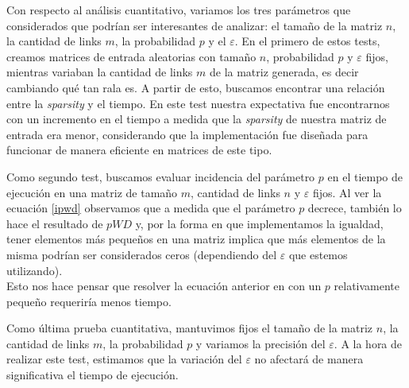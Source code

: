 \par 

Con respecto al an\'alisis cuantitativo, variamos los tres par\'ametros que considerados que podr\'ian ser interesantes de analizar:
el tama\~no de la matriz $n$, la cantidad de links $m$, la probabilidad $p$ y el $\varepsilon$.
\newline
En el primero de estos tests, creamos matrices de entrada aleatorias con tamaño $n$, probabilidad $p$ y $\varepsilon$ fijos, mientras variaban la cantidad de links $m$
de la matriz generada, es decir cambiando qu\'e tan rala es. A partir de esto, buscamos encontrar una relaci\'on entre la \textit{sparsity} y el tiempo.\newline
En este test nuestra expectativa fue encontrarnos con un incremento en el tiempo a medida 
que la \textit{sparsity} de nuestra matriz de entrada era menor, considerando que la
implementaci\'on fue diseñada para funcionar de manera eficiente en matrices de este tipo.

\par
Como segundo test, buscamos evaluar incidencia del par\'ametro $p$ en el tiempo de ejecuci\'on en una matriz de tamaño $m$, cantidad de links $n$ 
y $\varepsilon$ fijos.\newline
Al ver la ecuaci\'on \ref{ipwd} observamos que a medida que el par\'ametro $p$ decrece, tambi\'en lo hace el resultado de $pWD$ y, 
por la forma en que implementamos la igualdad, tener elementos m\'as pequeños en una matriz implica que m\'as elementos de la misma podr\'ian 
ser considerados ceros (dependiendo del $\varepsilon$ que estemos utilizando).\\
Esto nos hace pensar que resolver la ecuaci\'on anterior en con un $p$ relativamente pequeño  requerir\'ia menos tiempo.

\par
Como \'ultima prueba cuantitativa, mantuvimos fijos el tama\~no de la matriz $n$, la cantidad de links $m$, la probabilidad $p$ y variamos la precisi\'on del $\varepsilon$.
A la hora de realizar este test, estimamos que la variaci\'on del $\varepsilon$ no afectar\'a de manera significativa el tiempo de ejecuci\'on.

